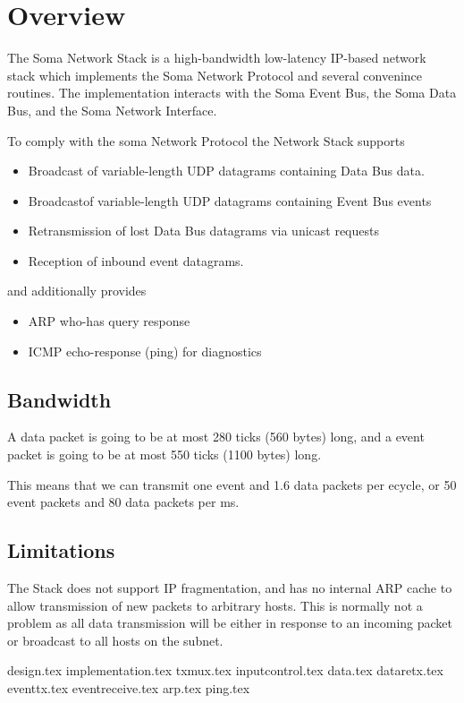 \section{Overview}

The Soma Network Stack is a high-bandwidth low-latency IP-based
network stack which implements the Soma Network Protocol and several
convenince routines. The implementation interacts with the Soma Event
Bus, the Soma Data Bus, and the Soma Network Interface.

To comply with the soma Network Protocol the Network Stack supports 
\begin{itemize}
\item Broadcast of variable-length UDP datagrams containing Data Bus data. 
\item Broadcastof variable-length UDP datagrams containing Event Bus events
\item Retransmission of lost Data Bus datagrams via unicast requests 
\item Reception of inbound event datagrams. 
\end{itemize}

and additionally provides 
\begin{itemize}
\item ARP who-has query response
\item ICMP echo-response (ping) for diagnostics
\end{itemize}

\subsection{Bandwidth}
A data packet is going to be at most 280 ticks (560 bytes) long, and a
event packet is going to be at most 550 ticks (1100 bytes) long.

This means that we can transmit one event and 1.6 data packets per
ecycle, or 50 event packets and 80 data packets per ms.


\subsection{Limitations}
The Stack does not support IP fragmentation, and has no internal ARP
cache to allow transmission of new packets to arbitrary hosts. This is
normally not a problem as all data transmission will be either in
response to an incoming packet or broadcast to all hosts on the
subnet.

{design.tex}
{implementation.tex}
{txmux.tex}
{inputcontrol.tex}
{data.tex}
{dataretx.tex}
{eventtx.tex}
{eventreceive.tex}
{arp.tex}
{ping.tex}


